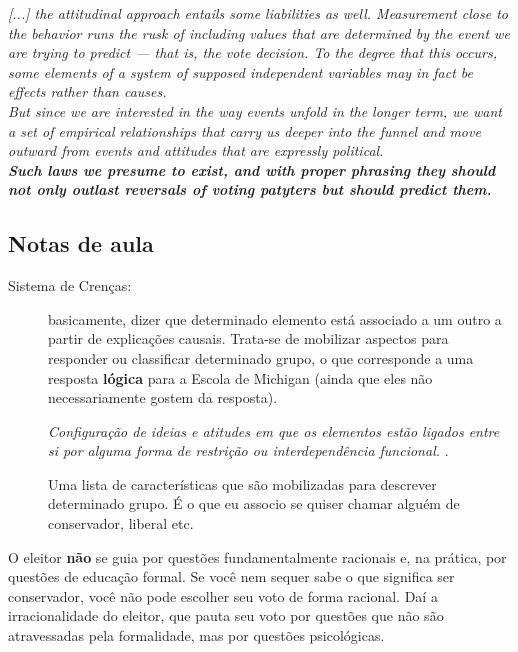 \noindent \textit{[...] the attitudinal approach entails some liabilities as well. Measurement close to the behavior runs the rusk of including values that are determined by the event we are trying to predict --- that is, the vote decision. To the degree that this occurs, some elements of a system of supposed independent variables may in fact be effects rather than causes.} \cite[~p. 35]{campbell} \\

\noindent \textit{But since we are interested in the way events unfold in the longer term, we want a set of empirical relationships that carry us deeper into the funnel and move outward from events and attitudes that are expressly political.} \cite[~p. 35]{campbell} \\

\noindent \textit{\textbf{Such laws we presume to exist, and with proper phrasing they should not only outlast reversals of voting patyters but should predict them.}} \cite[~p. 37]{campbell}

\subsection{Notas de aula}

\begin{description}
    \item [Sistema de Crenças:] basicamente, dizer que determinado elemento está associado a um outro a partir de explicações causais. Trata-se de mobilizar aspectos para responder ou classificar determinado grupo, o que corresponde a uma resposta \textbf{lógica} para a Escola de Michigan (ainda que eles não necessariamente gostem da resposta). 
    
    \textit{Configuração de ideias e atitudes em que os elementos estão ligados entre si por alguma forma de restrição ou interdependência funcional.} \cite[~p. 3]{converse_1964}. 
    
    Uma lista de características que são mobilizadas para descrever determinado grupo. É o que eu associo se quiser chamar alguém de conservador, liberal etc.
\end{description}

\noindent O eleitor \textbf{não} se guia por questões fundamentalmente racionais e, na prática, por questões de educação formal. Se você nem sequer sabe o que significa ser conservador, você não pode escolher seu voto de forma racional. Daí a irracionalidade do eleitor, que pauta seu voto por questões que não são atravessadas pela formalidade, mas por questões psicológicas. \\

